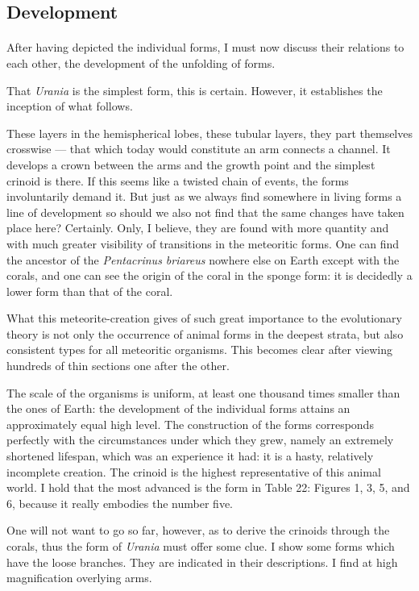 \documentclass[a4paper, 12pt, oneside]{article}
\begin{document}
\subsection{Development}
\paragraph{}
After having depicted the individual forms, I must now discuss their relations to each other, the development of the unfolding of forms.

That \emph{Urania} is the simplest form, this is certain. However, it establishes the inception of what follows.

These layers in the hemispherical lobes, these tubular layers, they part themselves crosswise --- that which today would constitute an arm connects a channel. It develops a crown between the arms and the growth point and the simplest crinoid is there. If this seems like a twisted chain of events, the forms involuntarily demand it. But just as we always find somewhere in living forms a line of development so should we also not find that the same changes have taken place here? Certainly. Only, I believe, they are found with more quantity and with much greater visibility of transitions in the meteoritic forms. One can find the ancestor of the \emph{Pentacrinus briareus} nowhere else on Earth except with the corals, and one can see the origin of the coral in the sponge form: it is decidedly a lower form than that of the coral.

What this meteorite-creation gives of such great importance to the evolutionary theory is not only the occurrence of animal forms in the deepest strata, but also consistent types for all meteoritic organisms. This becomes clear after viewing hundreds of thin sections one after the other.

The scale of the organisms is uniform, at least one thousand times smaller than the ones of Earth: the development of the individual forms attains an approximately equal high level. The construction of the forms corresponds perfectly with the circumstances under which they grew, namely an extremely shortened lifespan, which was an experience it had: it is a hasty, relatively incomplete creation. The crinoid is the highest representative of this animal world. I hold that the most advanced is the form in Table 22: Figures 1, 3, 5, and 6, because it really embodies the number five.

One will not want to go so far, however, as to derive the crinoids through the corals, thus the form of \emph{Urania} must offer some clue. I show some forms which have the loose branches. They are indicated in their descriptions. I find at high magnification overlying arms.
\end{document}

